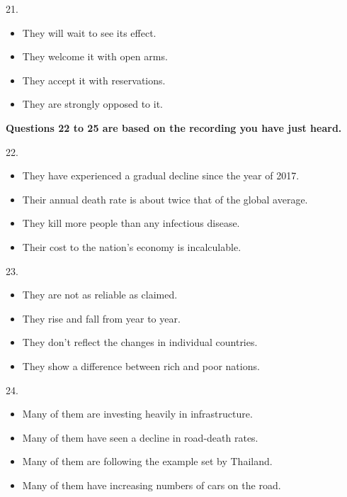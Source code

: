 \documentclass[UTF8,11pt]{ctexart}
\begin{document}
21.


\begin{itemize}[leftmargin=2em,itemsep=.2em,topsep=.4em]\item[A.] They will wait to see its effect.
\item[B.] They welcome it with open arms.
\item[C.] They accept it with reservations.
\item[D.] They are strongly opposed to it.
\end{itemize}

\textbf{Questions 22 to 25 are based on the recording you have just heard.}


22.


\begin{itemize}[leftmargin=2em,itemsep=.2em,topsep=.4em]\item[A.] They have experienced a gradual decline since the year of 2017.
\item[B.] Their annual death rate is about twice that of the global average.
\item[C.] They kill more people than any infectious disease.
\item[D.] Their cost to the nation's economy is incalculable.
\end{itemize}

23.


\begin{itemize}[leftmargin=2em,itemsep=.2em,topsep=.4em]\item[A.] They are not as reliable as claimed.
\item[B.] They rise and fall from year to year.
\item[C.] They don't reflect the changes in individual countries.
\item[D.] They show a difference between rich and poor nations.
\end{itemize}

24.


\begin{itemize}[leftmargin=2em,itemsep=.2em,topsep=.4em]\item[A.] Many of them are investing heavily in infrastructure.
\item[B.] Many of them have seen a decline in road-death rates.
\item[C.] Many of them are following the example set by Thailand.
\item[D.] Many of them have increasing numbers of cars on the road.
\end{itemize}
\end{document}
